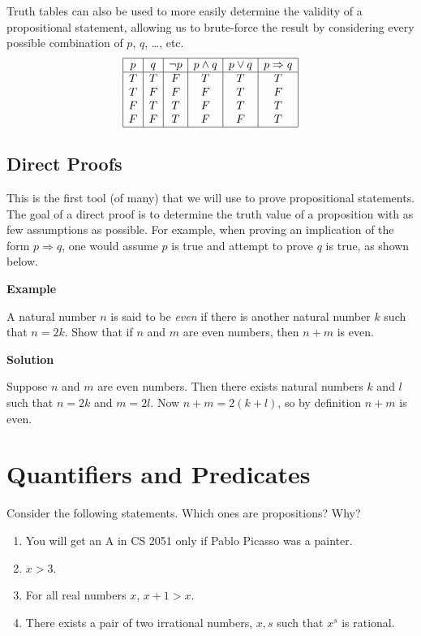 \documentclass{article}
\begin{document}
    \vspace{1.5mm}
    Truth tables can also be used to more easily determine the validity of a propositional statement, allowing us to brute-force the result by considering every possible combination of $p$, $q$, \dots, etc.
    $$\begin{array}{|c|c|c|c|c|c|}
        \hline
        p & q & \neg p & p \land q & p \lor q & p \Rightarrow q\\
        \hline
        T & T & F & T & T & T \\
        T & F & F & F & T & F \\
        F & T & T & F & T & T \\
        F & F & T & F & F & T \\
        \hline
    \end{array}$$

\subsection*{Direct Proofs}
    This is the first tool (of many) that we will use to prove propositional statements. The goal of a direct proof is to determine the truth value of a proposition with as few assumptions as possible. For example, when proving an implication of the form $p \Rightarrow q$, one would assume $p$ is true and attempt to prove $q$ is true, as shown below.

    \vspace{1.5mm}
    \textbf{Example}
    
    A natural number $n$ is said to be \textit{even} if there is another natural number $k$ such that $n = 2k$. Show that if $n$ and $m$ are even numbers, then $n + m$ is even.
    
    \vspace{1.5mm}
    \textbf{Solution}
    
    Suppose $n$ and $m$ are even numbers. Then there exists natural numbers $k$ and $l$ such that $n = 2k$ and $m = 2l$. Now $n + m = 2(k + l)$, so by definition $n + m$ is even.
    
\section*{Quantifiers and Predicates}
    Consider the following statements. Which ones are propositions? Why?
    \begin{enumerate}
        \item You will get an A in CS 2051 only if Pablo Picasso was a painter.
        \item $x > 3$.
        \item For all real numbers $x$, $x + 1 > x$.
        \item There exists a pair of two irrational numbers, $x, s$ such that $x^s$ is rational.
    \end{enumerate}
\end{document}

